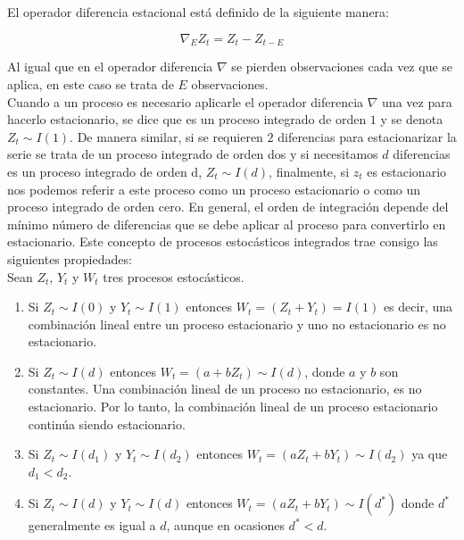 El operador diferencia estacional está definido de la siguiente manera:

\begin{equation}
\nabla_{E} Z_t=Z_t-Z_{t-E}
\end {equation}

Al igual que en el operador diferencia $\nabla$ se pierden observaciones cada vez que se aplica, en este caso se trata de $E$ observaciones.\\

Cuando a un proceso es necesario aplicarle el operador diferencia $\nabla$  una vez para hacerlo estacionario, se dice que es un proceso integrado de orden $1$ y se denota $Z_t \sim I(1)$. De manera similar, si se requieren $2$ diferencias para estacionarizar la serie se trata de un proceso integrado de orden dos y si necesitamos $d$ diferencias es un proceso integrado de orden d,  $Z_t \sim I(d)$, finalmente, si $z_t$ es estacionario nos podemos referir a este proceso como un proceso estacionario o como un proceso integrado de orden cero. En general, el orden de integración depende del mínimo número de diferencias que se debe aplicar al proceso para convertirlo en estacionario. Este concepto de procesos estocásticos integrados trae consigo las siguientes propiedades:\\

Sean $Z_t$, $Y_t$ y $W_t$ tres procesos estocásticos.

\begin{enumerate}%

\item
 Si $Z_t \sim I(0)$ y  $Y_t \sim I(1)$ entonces $W_t=(Z_t+Y_t) = I(1)$ es decir, una combinación lineal entre un proceso estacionario y uno no estacionario es no estacionario.

\item
Si $Z_t \sim I(d)$ entonces $W_t=(a+bZ_t) \sim I(d)$, donde $a$ y $b$ son constantes. Una combinación lineal de un proceso no estacionario, es no estacionario. Por lo tanto, la combinación lineal de un proceso estacionario continúa siendo estacionario.

\item 
Si $Z_t \sim I(d_1)$ y $Y_t \sim I(d_2)$ entonces $W_t=(aZ_t+bY_t) \sim I(d_2)$ ya que $d_1<d_2$.

\item
Si $Z_t \sim I(d)$  y $Y_t \sim I(d)$ entonces $W_t=(aZ_t+bY_t) \sim I(d^*)$ donde $d^*$ generalmente es igual a $d$, aunque en ocasiones $d^* < d$. 

\end{enumerate}

